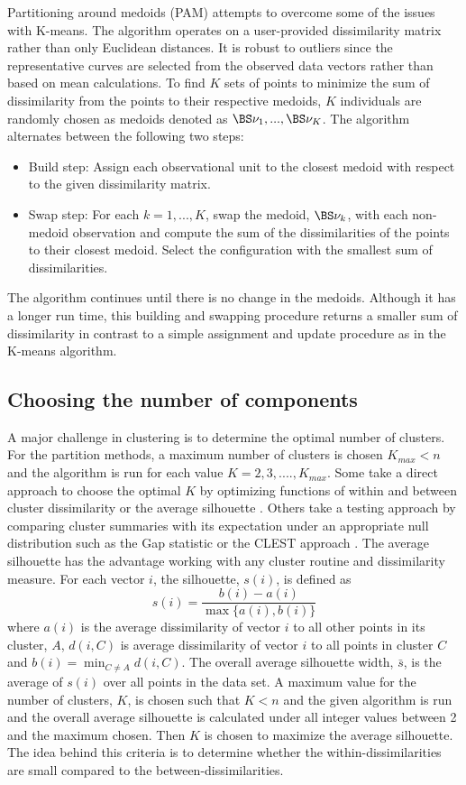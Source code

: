 Partitioning around medoids (PAM) attempts to overcome some of the issues with K-means. The algorithm operates on a user-provided dissimilarity matrix rather than only Euclidean distances. It is robust to outliers since the representative curves are selected from the observed data vectors rather than based on mean calculations. To find $K$ sets of points to minimize the sum of dissimilarity from the points to their respective medoids, $K$ individuals are randomly chosen as medoids denoted as $\BS \nu_{1},...,\BS \nu_{K}$. The algorithm alternates between the following two steps:
 \begin{itemize}
\item Build step: Assign each observational unit to the closest medoid with respect to the given dissimilarity matrix.
\item Swap step: For each $k=1,...,K$, swap the medoid, $\BS\nu_{k}$, with each non-medoid observation and compute the sum of the dissimilarities of the points to their closest medoid. Select the configuration with the smallest sum of dissimilarities.
\end{itemize}
The algorithm continues until there is no change in the medoids. Although it has a longer run time, this building and swapping procedure returns a smaller sum of dissimilarity in contrast to a simple assignment and update procedure as in the K-means algorithm. 

\subsection{Choosing the number of components}
A major challenge in clustering is to determine the optimal number of clusters. For the partition methods, a maximum number of clusters is chosen $K_{max}<n$ and the algorithm is run for each value $K=2,3,....,K_{max}$. Some take a direct approach to choose the optimal $K$  by optimizing functions of within and between cluster dissimilarity \cite{mulligan1985} or the average silhouette \cite{kaufman1990}. Others take a testing approach by comparing cluster summaries with its expectation under an appropriate null distribution such as the Gap statistic \cite{tibshirani2001} or the CLEST approach \cite{dudoit2002}. The average silhouette has the advantage working with any cluster routine and dissimilarity measure. For each vector $i$, the silhouette, $s(i)$, is defined as
$$s(i)=\frac{b(i)-a(i)}{\max\{a(i),b(i)\}}$$
where $a(i)$ is the average dissimilarity of vector $i$ to all other points in its cluster, $A$, $d(i,C)$ is average dissimilarity of vector $i$ to all points in cluster $C$ and $b(i)=\min_{C\not= A} d(i,C)$. The overall average silhouette width, $\bar{s}$, is the average of $s(i)$ over all points in the data set. A maximum value for the number of clusters, $K$, is chosen such that $K<n$ and the given algorithm is run and the overall average silhouette is calculated under all integer values between 2 and the maximum chosen. Then $K$ is chosen to maximize the average silhouette. The idea behind this criteria is to determine whether the within-dissimilarities are small compared to the between-dissimilarities. 

